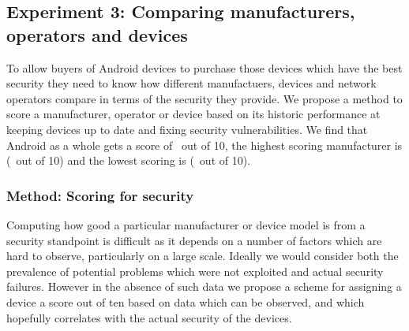 \subsection{Experiment 3: Comparing manufacturers, operators and devices}
\label{sec:security_scoring}\label{sec:exp:security_score}

To allow buyers of Android devices to purchase those devices which have the best security they need to know how different manufactuers, devices and network operators compare in terms of the security they provide.
We propose a method to score a manufacturer, operator or device based on its historic performance at keeping devices up to date and fixing security vulnerabilities.
We find that Android as a whole gets a score of \daSecurityScore\ out of 10, the highest scoring manufacturer is \emph{\daSecScoreBestmanufacturer} (\daSecScoreBestmanufacturerScore\ out of 10) and the lowest scoring is \emph{\daSecScoreWorstmanufacturer} (\daSecScoreWorstmanufacturerScore\ out of 10).

\subsubsection{Method: Scoring for security}

Computing how good a particular manufacturer or device model is from a security standpoint is difficult as it depends on a number of factors which are hard to observe, particularly on a large scale.
Ideally we would consider both the prevalence of potential problems which were not exploited and actual security failures.
However in the absence of such data we propose a scheme for assigning a device a score out of ten based on data which can be observed, and which hopefully correlates with the actual security of the devices.

